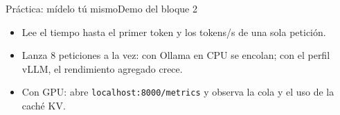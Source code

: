 \begin{frame}{Práctica: mídelo tú mismo}{Demo del bloque 2}
	\begin{itemize}
		\small
		\item Lee el tiempo hasta el primer token y los tokens/s de una sola petición.
		\item Lanza 8 peticiones a la vez: con Ollama en CPU se encolan; con el perfil vLLM, el rendimiento agregado crece.
		\item Con GPU: abre \texttt{localhost:8000/metrics} y observa la cola y el uso de la caché KV.
	\end{itemize}
\end{frame}
